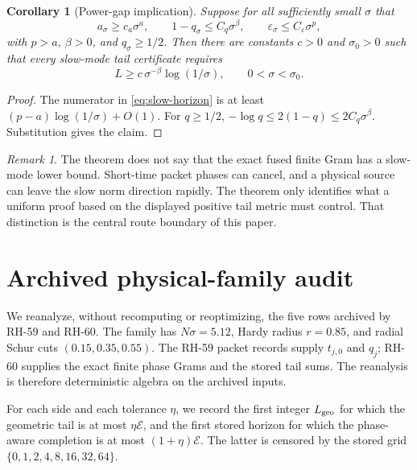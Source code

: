 \documentclass[11pt]{article}
\newtheorem{corollary}[theorem]{Corollary}
\theoremstyle{remark}
\newtheorem{remark}[theorem]{Remark}
\newcommand{\cE}{\mathcal E}
\begin{document}
\begin{corollary}[Power-gap implication]
\label{cor:power-gap}
Suppose for all sufficiently small $\sigma$ that
\begin{equation}
 a_\sigma\ge c_a\sigma^a,
 \qquad 1-q_\sigma\le C_q\sigma^\beta,
 \qquad \varepsilon_\sigma\le C_\varepsilon\sigma^p,
 \label{eq:power-assumptions}
\end{equation}
with $p>a$, $\beta>0$, and $q_\sigma\ge1/2$.  Then there are constants
$c>0$ and $\sigma_0>0$ such that every slow-mode tail certificate requires
\begin{equation}
 L\ge c\,\sigma^{-\beta}\log(1/\sigma),
 \qquad 0<\sigma<\sigma_0.
 \label{eq:power-horizon}
\end{equation}
\end{corollary}

\begin{proof}
The numerator in \eqref{eq:slow-horizon} is at least
$(p-a)\log(1/\sigma)+O(1)$.  For $q\ge1/2$,
$-\log q\le 2(1-q)\le2C_q\sigma^\beta$.  Substitution gives the claim.
\end{proof}

\begin{remark}
The theorem does not say that the exact fused finite Gram has a slow-mode
lower bound.  Short-time packet phases can cancel, and a physical source can
leave the slow norm direction rapidly.  The theorem only identifies what a
uniform proof based on the displayed positive tail metric must control.
That distinction is the central route boundary of this paper.
\end{remark}

\section{Archived physical-family audit}
\label{sec:audit}

We reanalyze, without recomputing or reoptimizing, the five rows archived by
RH-59 and RH-60.  The family has $N\sigma=5.12$, Hardy radius $r=0.85$,
and radial Schur cuts $(0.15,0.35,0.55)$.  The RH-59 packet records supply
$t_{j,0}$ and $q_j$; RH-60 supplies the exact finite phase Grams and the
stored tail sums.  The reanalysis is therefore deterministic algebra on the
archived inputs.

For each side and each tolerance $\eta$, we record the first integer
$L_{\rm geo}$ for which the geometric tail is at most
$\eta\cE$, and the first stored horizon for which the phase-aware completion
is at most $(1+\eta)\cE$.  The latter is censored by the stored grid
$\{0,1,2,4,8,16,32,64\}$.
\end{document}
